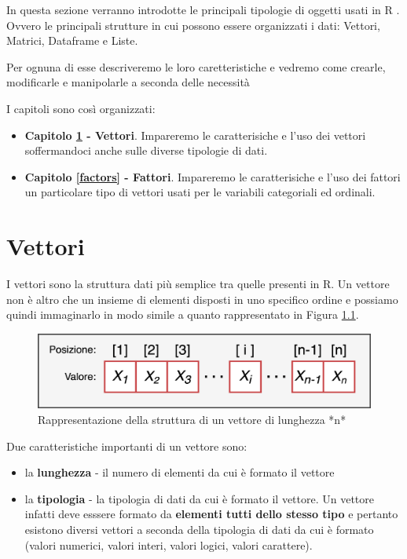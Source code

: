 \documentclass[
]{book}
\providecommand{\tightlist}{%
  \setlength{\itemsep}{0pt}\setlength{\parskip}{0pt}}
\begin{document}
In questa sezione verranno introdotte le principali tipologie di oggetti usati in R . Ovvero le principali strutture in cui possono essere organizzati i dati: Vettori, Matrici, Dataframe e Liste.

Per ognuna di esse descriveremo le loro caretteristiche e vedremo come crearle, modificarle e manipolarle a seconda delle necessità

I capitoli sono così organizzati:

\begin{itemize}
\tightlist
\item
  \textbf{Capitolo \ref{vector} - Vettori}. Impareremo le caratterisiche e l'uso dei vettori soffermandoci anche sulle diverse tipologie di dati.
\item
  \textbf{Capitolo \ref{factors} - Fattori}. Impareremo le caratterisiche e l'uso dei fattori un particolare tipo di vettori usati per le variabili categoriali ed ordinali.
\end{itemize}

\hypertarget{vector}{%
\chapter{Vettori}\label{vector}}

I vettori sono la struttura dati più semplice tra quelle presenti in R. Un vettore non è altro che un insieme di elementi disposti in uno specifico ordine e possiamo quindi immaginarlo in modo simile a quanto rappresentato in Figura \ref{fig:vector}.

\begin{figure}

{\centering \includegraphics[width=0.65\linewidth]{images/vector} 

}

\caption{Rappresentazione della struttura di un vettore di lunghezza *n*}\label{fig:vector}
\end{figure}

Due caratteristiche importanti di un vettore sono:

\begin{itemize}
\tightlist
\item
  la \textbf{lunghezza} - il numero di elementi da cui è formato il vettore
\item
  la \textbf{tipologia} - la tipologia di dati da cui è formato il vettore. Un vettore infatti deve esssere formato da \textbf{elementi tutti dello stesso tipo} e pertanto esistono diversi vettori a seconda della tipologia di dati da cui è formato (valori numerici, valori interi, valori logici, valori carattere).
\end{itemize}
\end{document}
